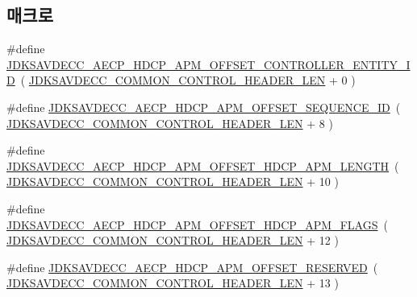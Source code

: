 \subsection*{매크로}
\begin{DoxyCompactItemize}
\item 
\#define \hyperlink{group__aecpdu__hdcp__apm__offsets_ga42ce76a4da10683c19fb5df0e9b20e8e}{J\+D\+K\+S\+A\+V\+D\+E\+C\+C\+\_\+\+A\+E\+C\+P\+\_\+\+H\+D\+C\+P\+\_\+\+A\+P\+M\+\_\+\+O\+F\+F\+S\+E\+T\+\_\+\+C\+O\+N\+T\+R\+O\+L\+L\+E\+R\+\_\+\+E\+N\+T\+I\+T\+Y\+\_\+\+ID}~( \hyperlink{group__jdksavdecc__avtp__common__control__header_gaae84052886fb1bb42f3bc5f85b741dff}{J\+D\+K\+S\+A\+V\+D\+E\+C\+C\+\_\+\+C\+O\+M\+M\+O\+N\+\_\+\+C\+O\+N\+T\+R\+O\+L\+\_\+\+H\+E\+A\+D\+E\+R\+\_\+\+L\+EN} + 0 )
\item 
\#define \hyperlink{group__aecpdu__hdcp__apm__offsets_gacbcfd14f3f229f3d0b0eda19936dbbf7}{J\+D\+K\+S\+A\+V\+D\+E\+C\+C\+\_\+\+A\+E\+C\+P\+\_\+\+H\+D\+C\+P\+\_\+\+A\+P\+M\+\_\+\+O\+F\+F\+S\+E\+T\+\_\+\+S\+E\+Q\+U\+E\+N\+C\+E\+\_\+\+ID}~( \hyperlink{group__jdksavdecc__avtp__common__control__header_gaae84052886fb1bb42f3bc5f85b741dff}{J\+D\+K\+S\+A\+V\+D\+E\+C\+C\+\_\+\+C\+O\+M\+M\+O\+N\+\_\+\+C\+O\+N\+T\+R\+O\+L\+\_\+\+H\+E\+A\+D\+E\+R\+\_\+\+L\+EN} + 8 )
\item 
\#define \hyperlink{group__aecpdu__hdcp__apm__offsets_gabadbbc2b7e8fa2545b18e7a9c6022b9a}{J\+D\+K\+S\+A\+V\+D\+E\+C\+C\+\_\+\+A\+E\+C\+P\+\_\+\+H\+D\+C\+P\+\_\+\+A\+P\+M\+\_\+\+O\+F\+F\+S\+E\+T\+\_\+\+H\+D\+C\+P\+\_\+\+A\+P\+M\+\_\+\+L\+E\+N\+G\+TH}~( \hyperlink{group__jdksavdecc__avtp__common__control__header_gaae84052886fb1bb42f3bc5f85b741dff}{J\+D\+K\+S\+A\+V\+D\+E\+C\+C\+\_\+\+C\+O\+M\+M\+O\+N\+\_\+\+C\+O\+N\+T\+R\+O\+L\+\_\+\+H\+E\+A\+D\+E\+R\+\_\+\+L\+EN} + 10 )
\item 
\#define \hyperlink{group__aecpdu__hdcp__apm__offsets_ga0f7465d66f1bd47ea039eb338f4f06b4}{J\+D\+K\+S\+A\+V\+D\+E\+C\+C\+\_\+\+A\+E\+C\+P\+\_\+\+H\+D\+C\+P\+\_\+\+A\+P\+M\+\_\+\+O\+F\+F\+S\+E\+T\+\_\+\+H\+D\+C\+P\+\_\+\+A\+P\+M\+\_\+\+F\+L\+A\+GS}~( \hyperlink{group__jdksavdecc__avtp__common__control__header_gaae84052886fb1bb42f3bc5f85b741dff}{J\+D\+K\+S\+A\+V\+D\+E\+C\+C\+\_\+\+C\+O\+M\+M\+O\+N\+\_\+\+C\+O\+N\+T\+R\+O\+L\+\_\+\+H\+E\+A\+D\+E\+R\+\_\+\+L\+EN} + 12 )
\item 
\#define \hyperlink{group__aecpdu__hdcp__apm__offsets_ga88c52f32fa94227d43fb922bfaee29b5}{J\+D\+K\+S\+A\+V\+D\+E\+C\+C\+\_\+\+A\+E\+C\+P\+\_\+\+H\+D\+C\+P\+\_\+\+A\+P\+M\+\_\+\+O\+F\+F\+S\+E\+T\+\_\+\+R\+E\+S\+E\+R\+V\+ED}~( \hyperlink{group__jdksavdecc__avtp__common__control__header_gaae84052886fb1bb42f3bc5f85b741dff}{J\+D\+K\+S\+A\+V\+D\+E\+C\+C\+\_\+\+C\+O\+M\+M\+O\+N\+\_\+\+C\+O\+N\+T\+R\+O\+L\+\_\+\+H\+E\+A\+D\+E\+R\+\_\+\+L\+EN} + 13 )

\end{DoxyCompactItemize}
